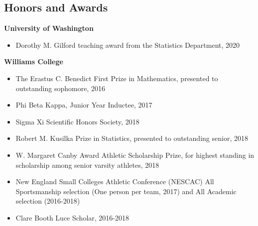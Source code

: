 \documentclass[margin, 10pt]{res} %
\begin{document}
\begin{resume}
{%


\section{Honors and Awards}
{\textbf{University of Washington}}
\begin{itemize}
\item Dorothy M. Gilford teaching award from the Statistics Department, 2020
\end{itemize}
{\textbf{Williams College}}
\begin{itemize}
\item The Erastus C. Benedict First Prize in Mathematics, presented to outstanding sophomore, 2016
\item Phi Beta Kappa, Junior Year Inductee, 2017
\item Sigma Xi Scientific Honors Society, 2018
\item Robert M. Kusilka Prize in Statistics, presented to outstanding senior, 2018
\item W. Margaret Canby Award Athletic Scholarship Prize, for highest standing in scholarship among senior varsity athletes, 2018
\item New England Small Colleges Athletic Conference (NESCAC) All Sportsmanship selection (One person per team, 2017) and All Academic selection (2016-2018)
\item Clare Booth Luce Scholar, 2016-2018
\end{itemize}

}
\end{resume}
\end{document}
